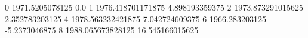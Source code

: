0 1971.5205078125 0.0
1 1976.418701171875 4.898193359375
2 1973.873291015625 2.352783203125
4 1978.563232421875 7.042724609375
6 1966.283203125 -5.2373046875
8 1988.065673828125 16.545166015625
